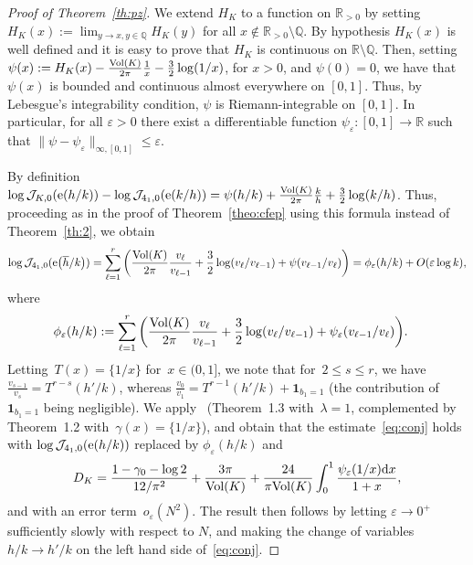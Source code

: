 \documentclass[11pt]{amsart}
\newcommand{\eps}{\varepsilon}
\newcommand{\R}{\mathbb{R}}
\newcommand{\Q}{\mathbb{Q}}
\newcommand{\J}{\mathcal{J}}
\newcommand{\tn}[1]{\textnormal{#1}}
\theoremstyle{definition}
\newcommand{\pr}[1]{\mathchoice{\left( #1\right)}{(#1)}{(#1)}{(#1)}}
\newcommand{\e}[1][]{\ifthenelse{\equal{#1}{}}{{\rm e}}{\operatorname{e}\pr{ #1}}}
\newcommand{\df}{\mathrm{d}}
\newcommand{\1}{{\mathbf 1}}
\newcommand{\gh}{H}
\let\originalleft\left
\let\originalright\right
\renewcommand{\left}{\mathopen{}\mathclose\bgroup\originalleft}
\renewcommand{\right}{\aftergroup\egroup\originalright}
\numberwithin{equation}{section}
\begin{document}
\begin{proof}[Proof of Theorem~\ref{th:pz}]
  We extend $\gh_{K}$ to a function on $\R_{>0}$ by setting $\gh_{K}(x):=\lim_{y\to x, y\in\Q}\gh_{K}(y)$ for all $x\not\in\R_{>0}\setminus \Q$. 
  By hypothesis $\gh_{K}(x)$ is well defined and it is easy to prove that $\gh_{K}$ is continuous on $\R\setminus\Q$. 
  Then, setting $\psi(x):=\gh_{K}(x)-\frac{\tn{Vol} (K)}{2\pi}\frac{1}x-\frac{3}2\log (1/x)$, for $x>0$, and $\psi(0)=0$, we have that $\psi(x)$ is bounded and continuous almost everywhere on $[0,1]$. Thus, by Lebesgue's integrability condition, $\psi$ is Riemann-integrable on $[0,1]$. In particular, for all $\eps>0$  there exist a differentiable function $\psi_\eps:[0,1]\to\R$ such that $\|\psi-\psi_\eps\|_{\infty,[0,1]}\leq\eps$.

  By definition $\log \J_{K,0}(\e[h/k])-\log \J_{4_1,0}(\e[k/h])=\psi(h/k)+\frac{\tn{Vol} (K)}{2\pi}\frac{k}h+\frac{3}2\log (k/h)$. Thus, proceeding as in the proof of Theorem~\ref{theo:cfep} using this formula instead of Theorem~\ref{th:2}, we obtain
  \begin{align*}
    \log \J_{4_1,0}(\e[ {\overline h}/k]) 
    &    = \sum_{\ell=1}^{r}\bigg(\frac{\tn{Vol} (K)}{2\pi}\frac{v_{\ell}}{v_{\ell-1}}+\frac{3}2\log ({v_{\ell}}/{v_{\ell-1}}) +
    \psi({v_{\ell-1}}/{v_{\ell}})\bigg)=\phi_\eps(h/k)+O(\eps\log k),\\
  \end{align*}
  where
  \begin{align*}
    \phi_\eps(h/k) &  :  = \sum_{\ell=1}^{r}\bigg(\frac{\tn{Vol} (K)}{2\pi}\frac{v_{\ell}}{v_{\ell-1}}+\frac{3}2\log ({v_{\ell}}/{v_{\ell-1}}) +
    \psi_\eps({v_{\ell-1}}/{v_{\ell}})\bigg).
  \end{align*}
  Letting~$T(x) = \{1/x\}$ for~$x\in(0, 1]$, we note that for~$2\leq s \leq r$, we have~$\frac{v_{s-1}}{{v_s}} = T^{r-s}(h'/k)$, whereas $\frac{v_{0}}{{v_1}} = T^{r-1}(h'/k)+\1_{b_1=1}$ (the contribution of $\1_{b_1=1}$ being negligible). We apply~\cite{BettinDrappeau} (Theorem~1.3 with~$\lambda=1$, complemented by Theorem~1.2 with~$\gamma(x) = \{1/x\}$), and obtain that the estimate~\eqref{eq:conj} holds with $\log \J_{4_1,0}(\e[{ h}/k])$ replaced by $\phi_\eps(h/k)$ and
  $$ D_K = \frac{1-\gamma_0 - \log 2}{12/\pi^2} + \frac{3\pi}{\tn{Vol}(K)} + \frac{24}{\pi\tn{Vol}(K)}\int_0^1 \frac{\psi_\eps(1/x)\df x}{1+x}, $$
  and with an error term~$o_\eps(N^2)$. The result then follows by letting $\eps\to0^+$ sufficiently slowly with respect to $N$, and making the change of variables $h/k\to h'/k$ on the left hand side of~\eqref{eq:conj}.
\end{proof}
\end{document}
